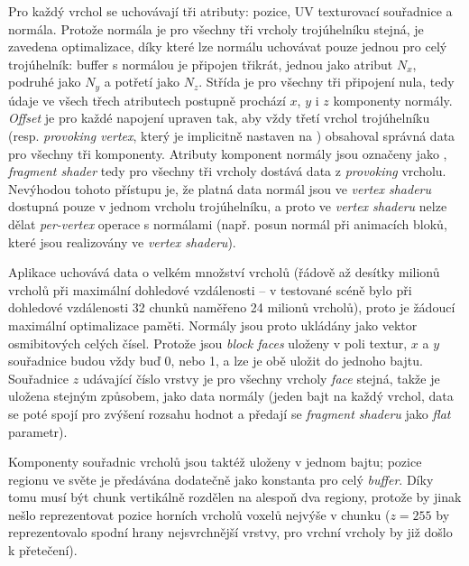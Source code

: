 Pro každý vrchol se uchovávají tři atributy: pozice, UV texturovací souřadnice a normála. Protože normála je pro všechny tři vrcholy trojúhelníku stejná, je zavedena optimalizace, díky které lze normálu uchovávat pouze jednou pro celý trojúhelník: buffer s normálou je připojen třikrát, jednou jako atribut $N_x$, podruhé jako $N_y$ a potřetí jako $N_z$. Střída je pro všechny tři připojení nula, tedy údaje ve všech třech atributech postupně prochází $x$, $y$ i $z$ komponenty normály. \textit{Offset} je pro každé napojení upraven tak, aby vždy třetí vrchol trojúhelníku (resp. \textit{provoking vertex}, který je implicitně nastaven na ) obsahoval správná data pro všechny tři komponenty. Atributy komponent normály jsou označeny jako , \textit{fragment shader} tedy pro všechny tři vrcholy dostává data z \textit{provoking} vrcholu. Nevýhodou tohoto přístupu je, že platná data normál jsou ve \textit{vertex shaderu} dostupná pouze v jednom vrcholu trojúhelníku, a proto ve \textit{vertex shaderu} nelze dělat \textit{per-vertex} operace s normálami (např. posun normál při animacích bloků, které jsou realizovány ve \textit{vertex shaderu}).


Aplikace uchovává data o velkém množství vrcholů (řádově až desítky milionů vrcholů při maximální dohledové vzdálenosti -- v testované scéně bylo při dohledové vzdálenosti 32 chunků naměřeno 24 milionů vrcholů), proto je žádoucí maximální optimalizace paměti. Normály jsou proto ukládány jako vektor osmibitových celých čísel. Protože jsou \textit{block faces} uloženy v poli textur, $x$ a $y$ souřadnice budou vždy buď 0, nebo 1, a lze je obě uložit do jednoho bajtu. Souřadnice $z$ udávající číslo vrstvy je pro všechny vrcholy \textit{face} stejná, takže je uložena stejným způsobem, jako data normály (jeden bajt na každý vrchol, data se poté spojí pro zvýšení rozsahu hodnot a předají se \textit{fragment shaderu} jako \textit{flat} parametr).

Komponenty souřadnic vrcholů jsou taktéž uloženy v jednom bajtu; pozice regionu ve světe je předávána dodatečně jako konstanta pro celý \textit{buffer}. Díky tomu musí být chunk vertikálně rozdělen na alespoň dva regiony, protože by jinak nešlo reprezentovat pozice horních vrcholů voxelů nejvýše v chunku ($z = 255$ by reprezentovalo spodní hrany nejsvrchnější vrstvy, pro vrchní vrcholy by již došlo k přetečení).

